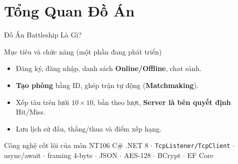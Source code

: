 \section{Tổng Quan Đồ Án}

\begin{frame}{Đồ Án Battleship Là Gì?}
  \begin{block}{Mục tiêu và chức năng (một phần đang phát triển)}
    \begin{itemize}
      \item Đăng ký, đăng nhập, danh sách \textbf{Online/Offline}, chat sảnh.
      \item \textbf{Tạo phòng} bằng ID, ghép trận tự động (\textbf{Matchmaking}).
      \item Xếp tàu trên lưới $10\times10$, bắn theo lượt, \textbf{Server là bên quyết định} Hit/Miss.
      \item Lưu lịch sử đấu, thắng/thua và điểm xếp hạng.
    \end{itemize}
  \end{block}
  \begin{exampleblock}{Công nghệ cốt lõi của môn NT106}
    C\# .NET 8 $\cdot$ \texttt{TcpListener/TcpClient} $\cdot$ async/await $\cdot$ framing 4-byte $\cdot$ JSON $\cdot$ AES-128 $\cdot$ BCrypt $\cdot$ EF Core
  \end{exampleblock}
\end{frame}

